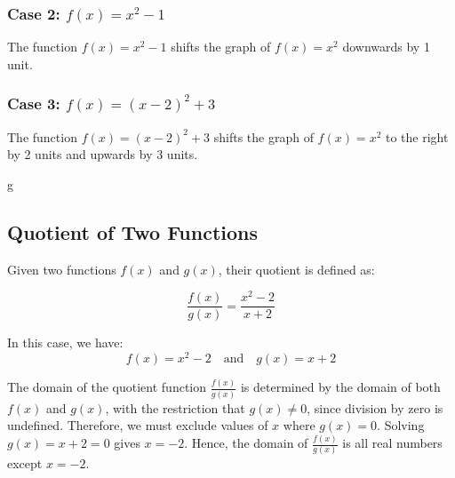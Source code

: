 \subsubsection*{Case 2: \( f(x) = x^2 - 1 \)}

The function \( f(x) = x^2 - 1 \) shifts the graph of \( f(x) = x^2 \) downwards by 1 unit.

\begin{center}
\end{center}

\subsubsection*{Case 3: \( f(x) = (x-2)^2 + 3 \)}

The function \( f(x) = (x-2)^2 + 3 \) shifts the graph of \( f(x) = x^2 \) to the right by 2 units and upwards by 3 units.

\begin{center}
\end{center}
g

\subsection{Quotient of Two Functions}

Given two functions \( f(x) \) and \( g(x) \), their quotient is defined as:

\[
\frac{f(x)}{g(x)} = \frac{x^2 - 2}{x + 2}
\]

In this case, we have:
\[
f(x) = x^2 - 2 \quad \text{and} \quad g(x) = x + 2
\]

The domain of the quotient function \( \frac{f(x)}{g(x)} \) is determined by the domain of both \( f(x) \) and \( g(x) \), with the restriction that \( g(x) \neq 0 \), since division by zero is undefined. Therefore, we must exclude values of \( x \) where \( g(x) = 0 \). Solving \( g(x) = x + 2 = 0 \) gives \( x = -2 \). Hence, the domain of \( \frac{f(x)}{g(x)} \) is all real numbers except \( x = -2 \).

